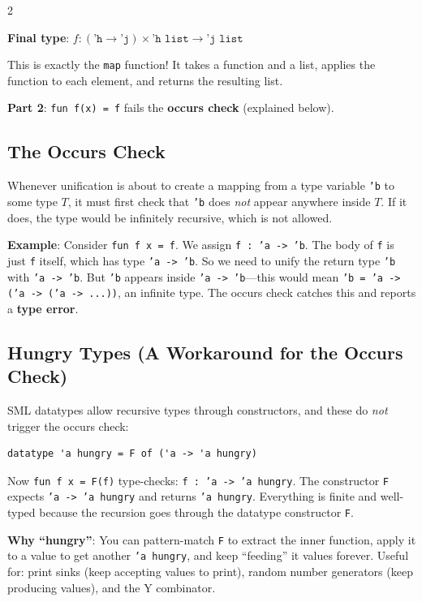 \documentclass[9pt,landscape]{extarticle}
\begin{document}
\begin{multicols}{2}
\begin{exambox}
\textbf{Final type}: $f : (\texttt{'h} \to \texttt{'j}) \times \texttt{'h list} \to \texttt{'j list}$

This is exactly the \texttt{map} function! It takes a function and a list, applies the function to each element, and returns the resulting list.

\textbf{Part 2}: \texttt{fun f(x) = f} fails the \textbf{occurs check} (explained below).
\end{exambox}

\subsection{The Occurs Check}

Whenever unification is about to create a mapping from a type variable \texttt{'b} to some type $T$, it must first check that \texttt{'b} does \emph{not} appear anywhere inside $T$. If it does, the type would be infinitely recursive, which is not allowed.

\textbf{Example}: Consider \texttt{fun f x = f}. We assign \texttt{f : 'a -> 'b}. The body of \texttt{f} is just \texttt{f} itself, which has type \texttt{'a -> 'b}. So we need to unify the return type \texttt{'b} with \texttt{'a -> 'b}. But \texttt{'b} appears inside \texttt{'a -> 'b}---this would mean \texttt{'b = 'a -> ('a -> ('a -> ...))}, an infinite type. The occurs check catches this and reports a \textbf{type error}.

\subsection{Hungry Types (A Workaround for the Occurs Check)}

SML datatypes allow recursive types through constructors, and these do \emph{not} trigger the occurs check:
\begin{lstlisting}
datatype 'a hungry = F of ('a -> 'a hungry)
\end{lstlisting}

Now \texttt{fun f x = F(f)} type-checks: \texttt{f : 'a -> 'a hungry}. The constructor \texttt{F} expects \texttt{'a -> 'a hungry} and returns \texttt{'a hungry}. Everything is finite and well-typed because the recursion goes through the datatype constructor \texttt{F}.

\textbf{Why ``hungry''}: You can pattern-match \texttt{F} to extract the inner function, apply it to a value to get another \texttt{'a hungry}, and keep ``feeding'' it values forever. Useful for: print sinks (keep accepting values to print), random number generators (keep producing values), and the Y combinator.


\end{multicols}
\end{document}
